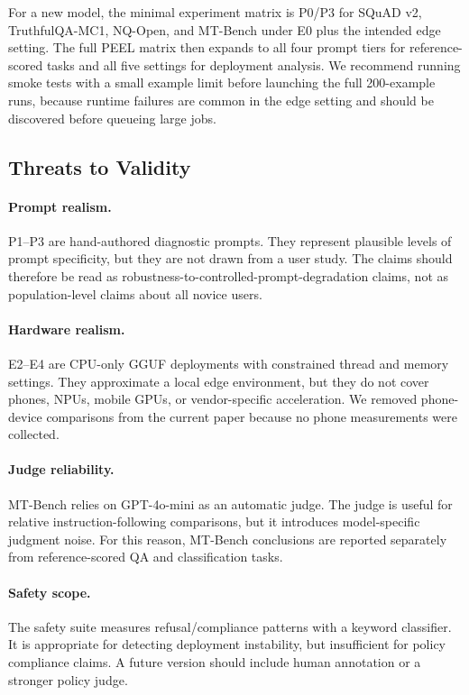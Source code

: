 \documentclass[letterpaper]{article} %
\begin{document}
For a new model, the minimal experiment matrix is P0/P3 for SQuAD v2,
TruthfulQA-MC1, NQ-Open, and MT-Bench under E0 plus the intended edge setting.
The full PEEL matrix then expands to all four prompt tiers for
reference-scored tasks and all five settings for deployment analysis. We
recommend running smoke tests with a small example limit before launching the
full 200-example runs, because runtime failures are common in the edge setting
and should be discovered before queueing large jobs.

\subsection{Threats to Validity}

\paragraph{Prompt realism.}
P1--P3 are hand-authored diagnostic prompts. They represent plausible levels of
prompt specificity, but they are not drawn from a user study. The claims should
therefore be read as robustness-to-controlled-prompt-degradation claims, not as
population-level claims about all novice users.

\paragraph{Hardware realism.}
E2--E4 are CPU-only GGUF deployments with constrained thread and memory settings.
They approximate a local edge environment, but they do not cover phones,
NPUs, mobile GPUs, or vendor-specific acceleration. We removed phone-device
comparisons from the current paper because no phone measurements were collected.

\paragraph{Judge reliability.}
MT-Bench relies on GPT-4o-mini as an automatic judge. The judge is useful for
relative instruction-following comparisons, but it introduces model-specific
judgment noise. For this reason, MT-Bench conclusions are reported separately
from reference-scored QA and classification tasks.

\paragraph{Safety scope.}
The safety suite measures refusal/compliance patterns with a keyword classifier.
It is appropriate for detecting deployment instability, but insufficient for
policy compliance claims. A future version should include human annotation or a
stronger policy judge.
\end{document}

